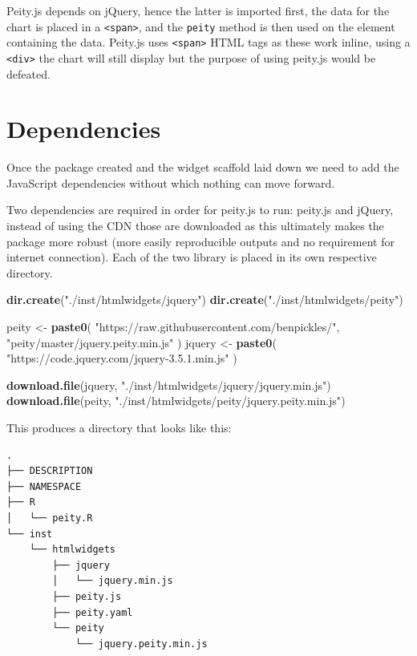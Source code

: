 \documentclass[
]{krantz}
\makeatletter
\newenvironment{Shaded}{\begin{snugshade}}{\end{snugshade}}
\newcommand{\KeywordTok}[1]{\textcolor[rgb]{0.27,0.27,0.27}{\textbf{#1}}}
\newcommand{\NormalTok}[1]{#1}
\newcommand{\StringTok}[1]{\textcolor[rgb]{0.5,0.5,0.5}{#1}}
\newenvironment{kframe}{%
\medskip{}
\setlength{\fboxsep}{.8em}
 \def\at@end@of@kframe{}%
 \ifinner\ifhmode%
  \def\at@end@of@kframe{\end{minipage}}%
  \begin{minipage}{\columnwidth}%
 \fi\fi%
 \def\FrameCommand##1{\hskip\@totalleftmargin \hskip-\fboxsep
 \colorbox{shadecolor}{##1}\hskip-\fboxsep
     \hskip-\linewidth \hskip-\@totalleftmargin \hskip\columnwidth}%
 \MakeFramed {\advance\hsize-\width
   \@totalleftmargin\z@ \linewidth\hsize
   \@setminipage}}%
 {\par\unskip\endMakeFramed%
 \at@end@of@kframe}
\renewenvironment{Shaded}{\begin{kframe}}{\end{kframe}}
\makeatother
\begin{document}
Peity.js depends on jQuery, hence the latter is imported first, the data for the chart is placed in a \texttt{\textless{}span\textgreater{}}, and the \texttt{peity} method is then used on the element containing the data. Peity.js uses \texttt{\textless{}span\textgreater{}} HTML tags as these work inline, using a \texttt{\textless{}div\textgreater{}} the chart will still display but the purpose of using peity.js would be defeated.

\hypertarget{widgets-realistic-deps}{%
\section{Dependencies}\label{widgets-realistic-deps}}

Once the package created and the widget scaffold laid down we need to add the JavaScript dependencies without which nothing can move forward.

Two dependencies are required in order for peity.js to run: peity.js and jQuery, instead of using the CDN those are downloaded as this ultimately makes the package more robust (more easily reproducible outputs and no requirement for internet connection). Each of the two library is placed in its own respective directory.

\begin{Shaded}
\begin{Highlighting}[]
\KeywordTok{dir.create}\NormalTok{(}\StringTok{"./inst/htmlwidgets/jquery"}\NormalTok{)}
\KeywordTok{dir.create}\NormalTok{(}\StringTok{"./inst/htmlwidgets/peity"}\NormalTok{)}

\NormalTok{peity <{-}}\StringTok{ }\KeywordTok{paste0}\NormalTok{(}
  \StringTok{"https://raw.githubusercontent.com/benpickles/"}\NormalTok{,}
  \StringTok{"peity/master/jquery.peity.min.js"}
\NormalTok{)}
\NormalTok{jquery <{-}}\StringTok{ }\KeywordTok{paste0}\NormalTok{(}
  \StringTok{"https://code.jquery.com/jquery{-}3.5.1.min.js"}
\NormalTok{)}

\KeywordTok{download.file}\NormalTok{(jquery, }\StringTok{"./inst/htmlwidgets/jquery/jquery.min.js"}\NormalTok{)}
\KeywordTok{download.file}\NormalTok{(peity, }\StringTok{"./inst/htmlwidgets/peity/jquery.peity.min.js"}\NormalTok{)}
\end{Highlighting}
\end{Shaded}

This produces a directory that looks like this:

\begin{verbatim}
.
├── DESCRIPTION
├── NAMESPACE
├── R
│   └── peity.R
└── inst
    └── htmlwidgets
        ├── jquery
        │   └── jquery.min.js
        ├── peity.js
        ├── peity.yaml
        └── peity
            └── jquery.peity.min.js
\end{verbatim}
\end{document}
